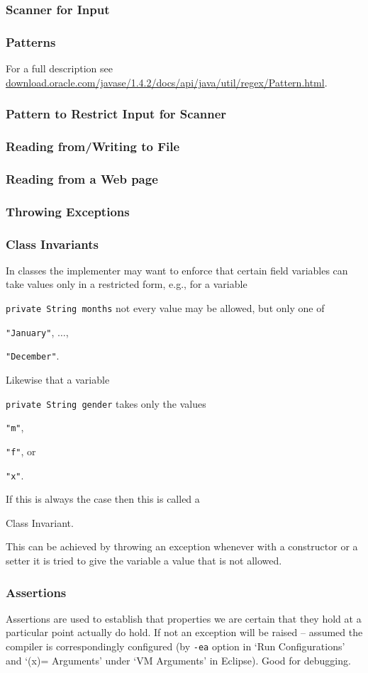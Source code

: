 \documentclass{beamer}
\def\mcolor#1#2{\rule{0ex}{0ex}\color{#1}#2\color{black}{}}
\begin{document}
\begin{frame}
\frametitle{Scanner for Input}

\end{frame}

\begin{frame}
\frametitle{Patterns}
 
For a full description see 
\href{http://download.oracle.com/javase/1.4.2/docs/api/java/util/regex/Pattern.html}{download.oracle.com/javase/1.4.2/docs/api/java/util/regex/Pattern.html}.

\end{frame}

\begin{frame}
\frametitle{Pattern to Restrict Input for Scanner}

\end{frame}


\begin{frame}
\frametitle{Reading from/Writing to File}\renewcommand{\baselinestretch}{0.8}\small 

\end{frame}


\begin{frame}
\frametitle{Reading from a Web page}
\begin{small}

\end{small}
\end{frame}

\begin{frame}
\frametitle{Throwing Exceptions}

\end{frame}

\begin{frame}
  \frametitle{Class Invariants} 
  In classes the implementer may want to enforce that certain field
  variables can take values only in a restricted form, e.g., for a
  variable \mcolor{blue}{\texttt{private String months}} not every value may be
  allowed, but only one of \mcolor{blue}{\texttt{"January"}}, $\ldots$, \mcolor{blue}{\texttt{"December"}}.

Likewise that a variable \mcolor{blue}{\texttt{private String gender}} takes only the values \mcolor{blue}{\texttt{"m"}}, \mcolor{blue}{\texttt{"f"}}, or \mcolor{blue}{\texttt{"x"}}.

 If this is always the case then this is called a \mcolor{blue}{Class Invariant}.

 This can be achieved by throwing an exception whenever with a
 constructor or a setter it is tried to give the variable a value that
 is not allowed.
\end{frame}

\begin{frame}
\frametitle{Assertions}

Assertions are used to establish that properties we are certain that
they hold at a particular point actually do hold. If not an exception
will be raised -- assumed the compiler is correspondingly configured
(by \texttt{-ea} option in `Run Configurations' and `(x)= Arguments'
under `VM Arguments' in Eclipse). Good for debugging.


\end{frame}
\end{document}
